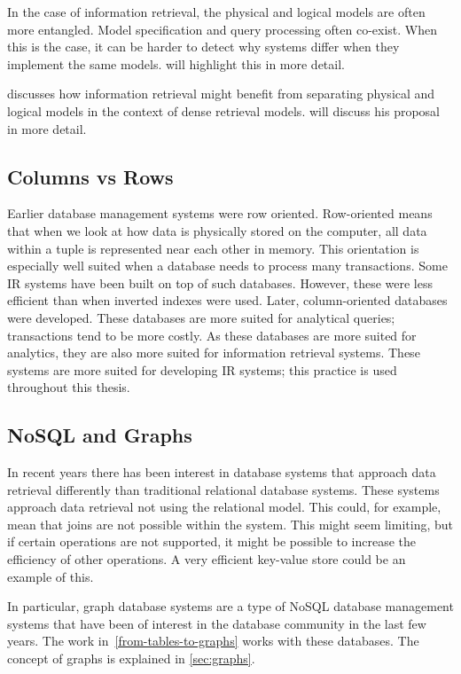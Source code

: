 In the case of information retrieval, the physical and logical models are often more entangled. Model specification and query processing often co-exist. When this is the case, it can be harder to detect why systems differ when they implement the same models.  will highlight this in more detail. 

\citet{seperation-logical-physical} discusses how information retrieval might benefit from separating physical and logical models in the context of dense retrieval models.  will discuss his proposal in more detail.

\subsection{Columns vs Rows}
Earlier database management systems were row oriented. Row-oriented means that when we look at how data is physically stored on the computer, all data within a tuple is represented near each other in memory. This orientation is especially well suited when a database needs to process many transactions. Some IR systems have been built on top of such databases. However, these were less efficient than when inverted indexes were used. Later, column-oriented databases were developed. These databases are more suited for analytical queries; transactions tend to be more costly. As these databases are more suited for analytics, they are also more suited for information retrieval systems. These systems are more suited for developing IR systems; this practice is used throughout this thesis. 

\subsection{NoSQL and Graphs}
\label{sec:nosqlgraph}
In recent years there has been interest in database systems that approach data retrieval differently than traditional relational database systems. These systems approach data retrieval not using the relational model. This could, for example, mean that joins are not possible within the system. This might seem limiting, but if certain operations are not supported, it might be possible to increase the efficiency of other operations. A very efficient key-value store could be an example of this.

In particular, graph database systems are a type of NoSQL database management systems that have been of interest in the database community in the last few years. The work in~\cref{from-tables-to-graphs} works with these databases. The concept of graphs is explained in \cref{sec:graphs}.

